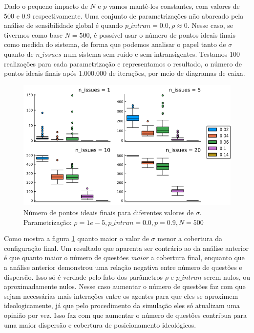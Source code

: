     Dado o pequeno impacto de \(N\) e \(p\) vamos mantê-los constantes, com
    valores de 500 e 0.9 respectivamente. Uma conjunto de parametrizações não
    abarcado pela análise de sensibilidade global é quando \(p\_intran = 0.0, \rho \approx
    0 \). Nesse caso, se tivermos como base \(N = 500\), é possível usar o
    número de pontos ideais finais como medida do sistema, de forma que podemos
    analisar o papel tanto de \(\sigma\) quanto de \(n\_issues\) num sistema sem
    ruído e sem intransigentes. Testamos 100 realizações para cada
    parametrização e representamos o resultado, o número de pontos ideais finais
    após 1.000.000 de iterações, por meio de diagramas de caixa.
    
  \begin{figure}[H]
    \centering
    \includegraphics[scale=0.7]{ims/boxes4.png}
    \caption{Número de pontos ideais finais para diferentes valores de \(\sigma\).
      Parametrização: \(\rho =1e-5, p\_intran = 0.0, p = 0.9, N =500\)}
    \label{fig:box4}
  \end{figure}
  
  Como mostra a figura \ref{fig:box4} quanto maior o valor de \(\sigma\) menor a
  cobertura da configuração final. Um resultado que aparenta ser contrário ao da
  análise anterior é que quanto maior o número de questões \textit{maior} a
  cobertura final, enquanto que a análise anterior demonstrou uma relação
  negativa entre número de questões e dispersão. Isso só é verdade pelo fato dos
  parâmetros \(\rho\) e \(p\_intran\) serem nulos, ou aproximadamente nulos. Nesse
  caso aumentar o número de questões faz com que sejam necessárias mais
  interações entre os agentes para que eles se aproximem ideologicamente, já que
  pelo procedimento da simulação eles só atualizam uma opinião por vez. Isso faz
  com que aumentar o número de questões contribua para uma maior dispersão e
  cobertura de posicionamento ideológicos.
  
